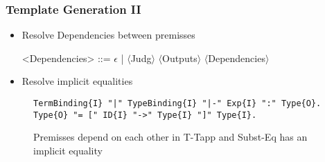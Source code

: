 \documentclass{beamer}
\begin{document}
\begin{frame}[fragile]
  \frametitle{Template Generation II}
\begin{itemize}
\item Resolve Dependencies between premisses
  \begin{grammar}
    <Dependencies> ::= $\epsilon$ | $\langle$Judg$\rangle$ $\langle$Outputs$\rangle$ $\langle$Dependencies$\rangle$
  \end{grammar}
\item Resolve implicit equalities
\end{itemize}

\begin{figure}
\begin{lstlisting}[language=sltc]
TermBinding{I} "|" TypeBinding{I} "|-" Exp{I} ":" Type{O}.
Type{O} "= [" ID{I} "->" Type{I} "]" Type{I}.
\end{lstlisting}

\caption{Premisses depend on each other in T-Tapp and
  Subst-Eq has an implicit equality}
\end{figure}
\end{frame}

\renewcommand*\selectTemplateOptimization{orange}
\renewcommand*\selectTemplateOptimization{}
\end{document}
